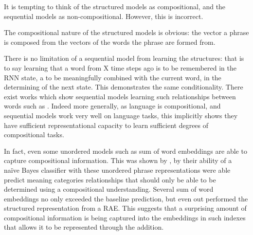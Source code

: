 \documentclass[12pt,parskip]{komatufte}
\begin{document}
It is tempting to think of the structured models as compositional,
and the sequential models as non-compositional.
However, this is incorrect.

The compositional nature of the structured models is obvious:
the vector a phrase is composed from the vectors of the words the phrase are formed from.

There is no limitation of a sequential model from learning the structures:
that is to say learning that a word from X time steps ago is to be remembered in the RNN state, a to be meaningfully combined with the current word, in the determining of the next state.
This demonstrates the same conditionality.
There exist works which show sequential models learning such relationships between words such as .
Indeed more generally, as language is compositional, and sequential models work very well on language tasks, this implicitly shows they have sufficient representational capacity to learn sufficient degrees of compositional tasks.

In fact, even some unordered models such as sum of word embeddings are able to capture compositional information.
This was shown by \textcite{RitterPosition}, by their ability of a na\"ive Bayes classifier with these unordered phrase representations were able predict meaning categories relationships that should only be able to be determined using a compositional understanding.
Several  sum of word embeddings no only exceeded the baseline prediction, but even out performed the structured representation from a RAE.
This suggests that a surprising amount of compositional information is being captured into the embeddings in such indexes that allows it to be represented through the addition.

 
\end{document}
